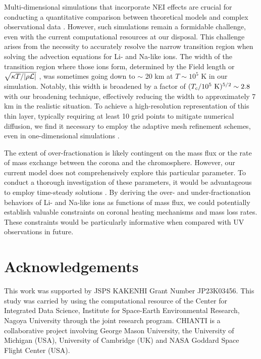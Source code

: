 \documentclass[fleqn,usenatbib]{mnras}
\begin{document}
Multi-dimensional simulations that incorporate NEI effects are crucial for conducting a quantitative comparison between theoretical models and complex observational data \citep{2013ApJ...767...43O, 2015ApJ...802....5O, 2016ApJ...817...46M}. However, such simulations remain a formidable challenge, even with the current computational resources at our disposal. This challenge arises from the necessity to accurately resolve the narrow transition region when solving the advection equations for Li- and Na-like ions.
The width of the transition region where those ions form, determined by the Field length or $\sqrt{\kappa T/|\rho {\cal L}|}$ \citep{1990ApJ...358..375B}, was sometimes going down to $\sim$ 20 km at $T\sim10^5$ K in our simulation. Notably, this width is broadened by a factor of $(T_c/10^5~{\rm K})^{5/2} \sim 2.8$ with our broadening technique, effectively reducing the width to approximately 7 km in the realistic situation. To achieve a high-resolution representation of this thin layer, typically requiring at least 10 grid points to mitigate numerical diffusion, we find it necessary to employ the adaptive mesh refinement schemes, even in one-dimensional simulations \citep{2003A&A...401..699B}.

The extent of over-fractionation is likely contingent on the mass flux or the rate of mass exchange between the corona and the chromosphere. However, our current model does not comprehensively explore this particular parameter. To conduct a thorough investigation of these parameters, it would be advantageous to employ time-steady solutions \citep{1989ApJ...338.1131N,1990ApJ...362..370S,2020ApJ...901..150G}.
By deriving the over- and under-fractionation behaviors of Li- and Na-like ions as functions of mass flux, we could potentially establish valuable constraints on coronal heating mechanisms and mass loss rates. These constraints would be particularly informative when compared with UV observations in future.

\section*{Acknowledgements}

This work was supported by JSPS KAKENHI Grant Number JP23K03456.
This study was carried by using the computational resource of the Center for Integrated Data Science, Institute for Space-Earth Environmental Research, Nagoya University through the joint research program.
CHIANTI is a collaborative project involving George Mason University, the University of Michigan (USA), University of Cambridge (UK) and NASA Goddard Space Flight Center (USA).
\end{document}
